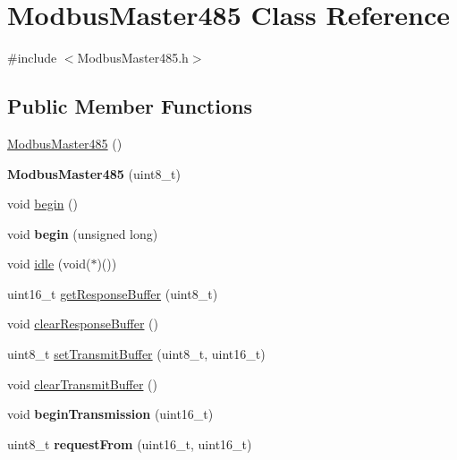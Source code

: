 \hypertarget{class_modbus_master485}{}\section{Modbus\+Master485 Class Reference}
\label{class_modbus_master485}


{\ttfamily \#include $<$Modbus\+Master485.\+h$>$}

\subsection*{Public Member Functions}
\begin{DoxyCompactItemize}
\item 
\hyperlink{class_modbus_master485_a3dbd315a6e62987c587d8cdadd1abfc2}{Modbus\+Master485} ()
\item 
{\bfseries Modbus\+Master485} (uint8\+\_\+t)\hypertarget{class_modbus_master485_a04d261601a1f5f6b54d05641531a3fde}{}\label{class_modbus_master485_a04d261601a1f5f6b54d05641531a3fde}

\item 
void \hyperlink{class_modbus_master485_a9b2abc8616c7c87d86f882a5d10fd307}{begin} ()
\item 
void {\bfseries begin} (unsigned long)\hypertarget{class_modbus_master485_aeb9f24d78b3014950b98a062a6d1b0ab}{}\label{class_modbus_master485_aeb9f24d78b3014950b98a062a6d1b0ab}

\item 
void \hyperlink{class_modbus_master485_a139739234cf9199546781d43a6d4ed6f}{idle} (void($\ast$)())
\item 
uint16\+\_\+t \hyperlink{class_modbus_master485_a01d677f6eccd79b431444ce07f7ca10f}{get\+Response\+Buffer} (uint8\+\_\+t)
\item 
void \hyperlink{class_modbus_master485_a5428ccaaa7d790a5fd10c585429c841f}{clear\+Response\+Buffer} ()
\item 
uint8\+\_\+t \hyperlink{class_modbus_master485_a471792408d5d0d77011ad4e5c7229b03}{set\+Transmit\+Buffer} (uint8\+\_\+t, uint16\+\_\+t)
\item 
void \hyperlink{class_modbus_master485_aa1957373b3f6da34f5821ed1db4b8b20}{clear\+Transmit\+Buffer} ()
\item 
void {\bfseries begin\+Transmission} (uint16\+\_\+t)\hypertarget{class_modbus_master485_ab3c4a53e4b79a68e626e1b9b68d35428}{}\label{class_modbus_master485_ab3c4a53e4b79a68e626e1b9b68d35428}

\item 
uint8\+\_\+t {\bfseries request\+From} (uint16\+\_\+t, uint16\+\_\+t)\hypertarget{class_modbus_master485_afcfa3ebb2117b1573c692cb51fdb0743}{}\label{class_modbus_master485_afcfa3ebb2117b1573c692cb51fdb0743}


\end{DoxyCompactItemize}
